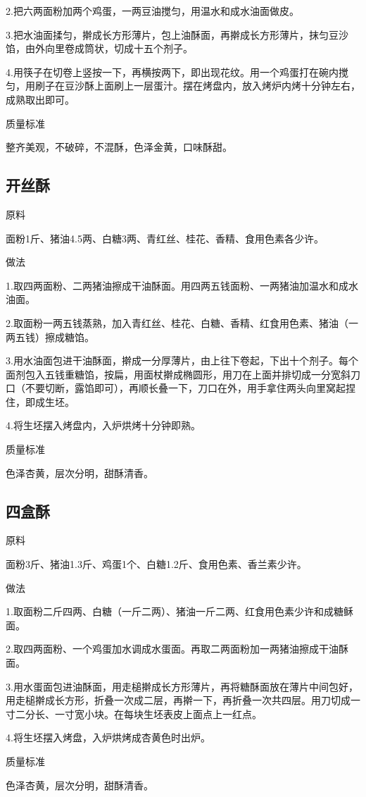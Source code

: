 \documentclass{ctexbook}
\begin{document}
2.把六两面粉加两个鸡蛋，一两豆油搅匀，用温水和成水油面做皮。

3.把水油面揉匀，擀成长方形薄片，包上油酥面，再擀成长方形薄片，抹匀豆沙馅，由外向里卷成筒状，切成十五个剂子。

4.用筷子在切卷上竖按一下，再横按两下，即出现花纹。用一个鸡蛋打在碗内搅匀，用刷子在豆沙酥上面刷上一层蛋汁。摆在烤盘内，放入烤炉内烤十分钟左右，成熟取出即可。

质量标准

整齐美观，不破碎，不混酥，色泽金黄，口味酥甜。
\subsection{开丝酥}
原料

面粉1斤、猪油4.5两、白糖3两、青红丝、桂花、香精、食用色素各少许。

做法

1.取四两面粉、二两猪油擦成干油酥面。用四两五钱面粉、一两猪油加温水和成水油面。

2.取面粉一两五钱蒸熟，加入青红丝、桂花、白糖、香精、红食用色素、猪油（一两五钱）擦成糖馅。

3.用水油面包进干油酥面，擀成一分厚薄片，由上往下卷起，下出十个剂子。每个面剂包入五钱重糖馅，按扁，用面杖擀成椭圆形，用刀在上面并排切成一分宽斜刀口（不要切断，露馅即可），再顺长叠一下，刀口在外，用手拿住两头向里窝起捏住，即成生坯。

4.将生坯摆入烤盘内，入炉烘烤十分钟即熟。

质量标准

色泽杏黄，层次分明，甜酥清香。
\subsection{四盒酥}
原料

面粉3斤、猪油1.3斤、鸡蛋1个、白糖1.2斤、食用色素、香兰素少许。

做法

1.取面粉二斤四两、白糖（一斤二两）、猪油一斤二两、红食用色素少许和成糖稣面。

2.取四两面粉、一个鸡蛋加水调成水蛋面。再取二两面粉加一两猪油擦成干油酥面。

3.用水蛋面包进油酥面，用走槌擀成长方形薄片，再将糖酥面放在薄片中间包好，用走槌擀成长方形，折叠一次成二层，再擀一下，再折叠一次共四层。用刀切成一寸二分长、一寸宽小块。在每块生坯表皮上面点上一红点。

4.将生坯摆入烤盘，入炉烘烤成杏黄色时出炉。

质量标准

色泽杏黄，层次分明，甜酥清香。
\end{document}
